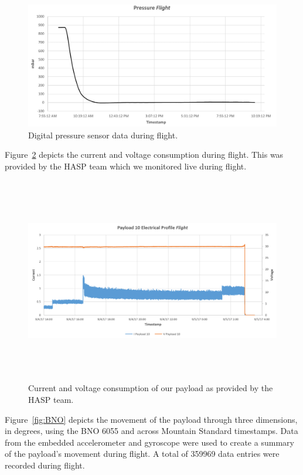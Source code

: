 \begin{figure}[h!]
\centering
\includegraphics[width=\textwidth]{./Figures/pressure.jpg}
\caption{Digital pressure sensor data during flight.}
\label{fig:Pressure} 
\end{figure}
Figure~\ref{fig:Electrical-Profile} depicts the current and voltage consumption during flight.  This was provided by the HASP team which we monitored live during flight. 

\begin{figure}[H]
\centering
\includegraphics[height=9cm, width=\textwidth]{./Figures/payload-10-electrical-profile}
\caption{Current and voltage consumption of our payload as provided by the HASP team.}
\label{fig:Electrical-Profile}
\end{figure}

\clearpage
Figure~\ref{fig:BNO} depicts the movement of the payload through three dimensions, in degrees, using the BNO 6055 and across Mountain Standard timestamps.  Data from the embedded accelerometer and gyroscope were used to create a summary of the payload's movement during flight.  A total of \num{359969} data entries were recorded during flight. 

